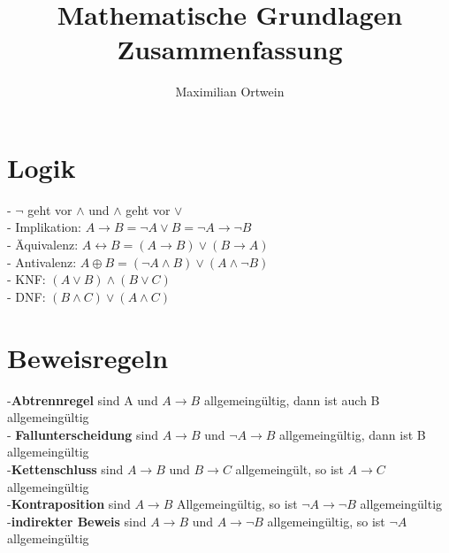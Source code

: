 \documentclass[a4paper]{scrartcl}
\begin{document}
\author{Maximilian Ortwein}
\title{Mathematische Grundlagen Zusammenfassung }
\fancyfoot[C]{\thepage}
\renewcommand{\footrulewidth}{0.5pt}
\renewcommand{\headrulewidth}{0.5pt}
\maketitle
\tableofcontents
\pagebreak

\section{Logik} %
- $\neg$ geht vor $\wedge$ und $\wedge$ geht vor $\vee$\\
- Implikation: $A \to B = \neg A \vee B = \neg A \to \neg B$\\
- Äquivalenz: $A \leftrightarrow B = (A \to B) \vee (B \to A)$\\
- Antivalenz: $A \oplus B = (\neg A \wedge B) \vee (A \wedge \neg B)$\\
- KNF: $(A \vee B) \wedge (B \vee C)$\\
- DNF: $(B \wedge C) \vee (A \wedge C)$\\

\section{Beweisregeln}
-\textbf{Abtrennregel} sind A und $ A \to B$ allgemeingültig, dann ist auch B allgemeingültig\\
- \textbf{Fallunterscheidung} sind $A \to B$ und $ \neg A \to B$ allgemeingültig, dann ist B allgemeingültig\\
-\textbf{Kettenschluss} sind $A\to B$ und $B \to C$ allgemeingült, so ist $A \to C$ allgemeingültig\\
-\textbf{Kontraposition} sind $A \to B$ Allgemeingültig, so ist $\neg A \to \neg B$ allgemeingültig\\
-\textbf{indirekter Beweis} sind $A \to B$ und $A \to \neg B$ allgemeingültig, so ist $\neg A$ allgemeingültig\\ 
\end{document}
